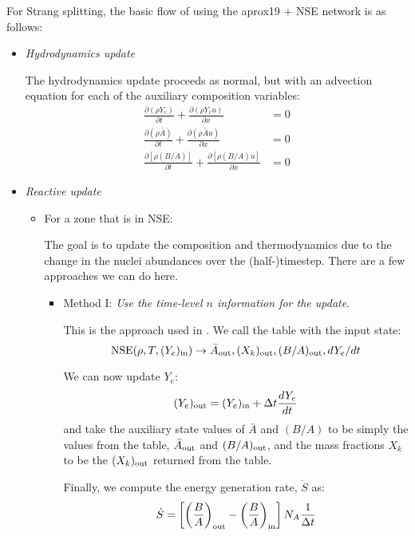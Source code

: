 \documentclass[times,modern]{aastex63}
\newcommand{\Sdot}{\dot{S}}
\newcommand{\ddx}[1]{{\frac{{\partial#1}}{\partial x}}}
\newcommand{\ddt}[1]{{\frac{{\partial#1}}{\partial t}}}
\newcommand{\nse}[1]{{\mathrm{NSE}( #1 )}}
\newcommand{\out}{{\rm out}}
\begin{document}
For Strang splitting, the basic flow of using the aprox19 + NSE network
is as follows:
\begin{itemize}

\item {\em Hydrodynamics update}

  The hydrodynamics update proceeds as normal, but with an advection
  equation for each of the auxiliary composition variables:
  \begin{align}
    \ddt{(\rho Y_e)} + \ddx{(\rho Y_e u)} &= 0 \\
    \ddt{(\rho \bar{A})} + \ddx{(\rho \bar{A} u)} &= 0 \\
    \ddt{[\rho (B/A)]} + \ddx{[\rho (B/A) u]} &= 0 
  \end{align}


\item {\em Reactive update}

  \begin{itemize}

    \item For a zone that is in NSE:

      The goal is to update the composition and thermodynamics due to the 
      change in the nuclei abundances over the (half-)timestep.  There are
      a few approaches we can do here.

      \begin{itemize}
      \item Method I: {\em Use the time-level $n$ information for the update}.

        This is the approach used in \citet{ma:2013}.  We call the table with the 
        input state:
        \begin{equation}
          \nse{\rho, T, (Y_e)_{\rm in}} \rightarrow \bar{A}_\out, (X_k)_\out, (B/A)_\out, dY_e/dt
        \end{equation}

        We can now update $Y_e$:
        \begin{equation}
          (Y_e)_{\rm out} = (Y_e)_{\rm in} + \Delta t \frac{dY_e}{dt}
        \end{equation}
        and take the auxiliary state values of $\bar{A}$ and $(B/A)$ to be simply
        the values from the table, $\bar{A}_\out$ and $(B/A)_\out$, and the mass fractions
        $X_k$ to be the $(X_k)_{\rm out}$ returned from the table.

        Finally, we compute the energy generation rate, $\Sdot$ as:
        \begin{equation}
          \label{eq:nse_energy}
          \Sdot = \left [ \left ( \frac{B}{A} \right )_{\rm out} -
            \left ( \frac{B}{A} \right )_{\rm in} \right ] N_A \frac{1}{\Delta t}
        \end{equation}


\end{itemize}
\end{itemize}
\end{itemize}
\end{document}
